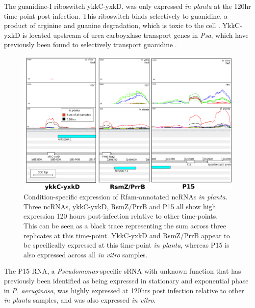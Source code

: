 The guanidine-I riboswitch ykkC-yxkD, was only expressed \textit{in planta} at the 120hr time-point post-infection. This riboswitch binds selectively to guanidine, a product of arginine and guanine degradation, which is toxic to the cell \citep{Nelson2017-lz}. YkkC-yxkD is located upstream of urea carboyxlase transport genes in \textit{Psa}, which have previously been found to selectively transport guanidine \citep{Nelson2017-lz}. 

 \hfill
\begin{figure}[H]
    \centering
    \includegraphics[scale=0.9]{psa/psa_ncRNA/rfam_120hrs.png}
    \caption[Condition-specific expression of Rfam-annotated ncRNAs \textit{in planta}]{Condition-specific expression of Rfam-annotated ncRNAs \textit{in planta}. Three ncRNAs, ykkC-yxkD, RsmZ/PrrB and P15 all show high expression 120 hours post-infection relative to other time-points. This can be seen as a black trace representing the sum across three replicates at this time-point. YkkC-yxkD and RsmZ/PrrB appear to be specifically expressed at this time-point \textit{in planta}, whereas P15 is also expressed across all \textit{in vitro} samples. }
    \label{fig:rfam_120}
\end{figure}
\newpage
The P15 RNA, a \textit{Pseudomonas}-specific sRNA with unknown function that has previously been identified as being expressed in stationary and exponential phase in \textit{P. aeruginosa}, was highly expressed at 120hrs post infection relative to other \textit{in planta} samples, and was also expressed \textit{in vitro}.

